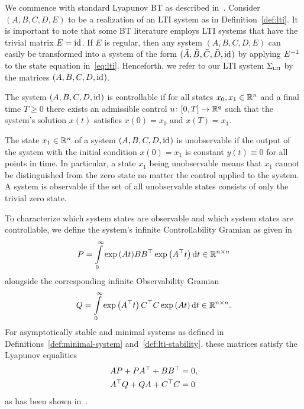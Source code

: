 We commence with standard Lyapunov \ac{BT} as described in~\cite{BB2017}.
Consider $(A, B, C, D, E)$ to be a realization of an \ac{LTI} system as in Definition~\ref{def:lti}.
It is important to note that some \ac{BT} literature employs \ac{LTI} systems that have the trivial matrix $E = \text{id}_{}$.
If $E$ is regular, then any system $(A, B, C, D, E)$ can easily be transformed into a system of the form $(\tilde{A}, \tilde{B}, \tilde{C}, \tilde{D}, \text{id}_{})$ by applying $E\inv$ to the state equation in~\eqref{eq:lti}.
Henceforth, we refer to our \ac{LTI} system $\Sigma_{\textnormal{\scshape lti}}$ by the matrices $(A, B, C, D, \text{id}_{})$.

\begin{definition}\label{def:controllability}
    The system $(A, B, C, D, \text{id}_{})$ is controllable if for all states $x_0, x_1 \in \mathbb{R}^n$ and a final time $T \geq 0$ there exists an admissible control $u \colon \interval{0}{T} \to \bb{R}^q$ such that the system's solution $x(t)$ satisfies $x(0) = x_0$ and $x(T) = x_1$.
\end{definition}

\begin{definition}\label{def:observability}
    The state $x_1 \in \mathbb{R}^n$ of a system $(A, B, C, D, \text{id}_{})$ is unobservable if the output of the system with the initial condition $x(0) = x_1$ is constant $y(t) \equiv 0$ for all points in time.
    In particular, a state $x_1$ being unobservable means that $x_1$ cannot be distinguished from the zero state no matter the control applied to the system.
    A system is observable if the set of all unobservable states consists of only the trivial zero state.
\end{definition}

To characterize which system states are observable and which system states are controllable, we define the system's infinite Controllability Gramian as given in~\cite[Equation~6.8]{BB2017}
\begin{equation}\label{eq:controllability-gramian}
    P = \int\limits_0^\infty \exp{(A t)} B B^{\top} \exp \left( A^{\top} t \right) \mathop{}\!\mathrm{d} t \in \mathbb{R}^{n \times n}
\end{equation}
alongside the corresponding infinite Observability Gramian
\begin{equation}\label{eq:observability-gramian}
    Q = \int\limits_0^\infty \exp \left( A^{\top} t \right) C^{\top} C \exp{(A t)} \mathop{}\!\mathrm{d} t \in \mathbb{R}^{n \times n}.
\end{equation}
For asymptotically stable and minimal systems as defined in Definitions~\ref{def:minimal-system} and~\ref{def:lti-stability}, these matrices satisfy the Lyapunov equalities
\begin{equation}\label{eq:lyapunov-equations}
    \begin{aligned}
        A P + P A^{\top} + B B^{\top} &= 0, \\
        A^{\top} Q + Q A + C^{\top} C &= 0
    \end{aligned}
\end{equation}
as has been shown in~\cite{Antoulas2005, Hinrichsen2005}.


